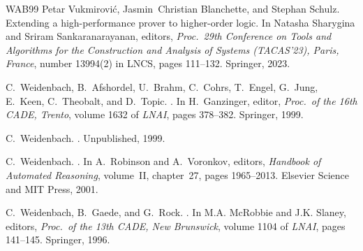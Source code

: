 \documentclass{report}
\begin{document}
\begin{thebibliography}{WAB{\etalchar{+}}99}
Petar Vukmirovi{\'c}, Jasmin~Christian Blanchette, and Stephan Schulz.
\newblock Extending a high-performance prover to higher-order logic.
\newblock In Natasha Sharygina and Sriram Sankaranarayanan, editors, {\em
  Proc.\ 29th Conference on Tools and Algorithms for the Construction and
  Analysis of Systems (TACAS'23), Paris, France}, number 13994(2) in LNCS,
  pages 111--132. Springer, 2023.

C.~Weidenbach, B.~Afshordel, U.~Brahm, C.~Cohrs, T.~Engel, G.~Jung, E.~Keen,
  C.~Theobalt, and D.~Topic.
.
\newblock In H.~Ganzinger, editor, {\em Proc.\ of the 16th CADE, Trento},
  volume 1632 of {\em LNAI}, pages 378--382. Springer, 1999.

C.~Weidenbach.
.
\newblock Unpublished, 1999.

C.~Weidenbach.
.
\newblock In A.~Robinson and A.~Voronkov, editors, {\em Handbook of Automated
  Reasoning}, volume~II, chapter~27, pages 1965--2013. Elsevier Science and MIT
  Press, 2001.

C.~Weidenbach, B.~Gaede, and G.~Rock.
.
\newblock In M.A. McRobbie and J.K. Slaney, editors, {\em Proc.\ of the 13th
  CADE, New Brunswick}, volume 1104 of {\em LNAI}, pages 141--145. Springer,
  1996.

\end{thebibliography}

\printindex
\end{document}
